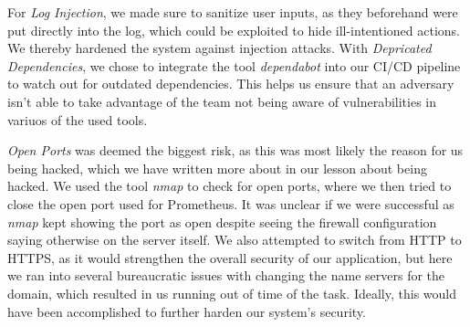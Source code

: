 For \textit{Log Injection}, we made sure to sanitize user inputs, as they beforehand were put directly into the log, which could be exploited to hide ill-intentioned actions. We thereby hardened the system against injection attacks.
With \textit{Depricated Dependencies}, we chose to integrate the tool \textit{dependabot} into our CI/CD pipeline to watch out for outdated dependencies. This helps us ensure that an adversary isn't able to take advantage of the team not being aware of vulnerabilities in variuos of the used tools.

\textit{Open Ports} was deemed the biggest risk, as this was most likely the reason for us being hacked, which we have written more about in our lesson about being hacked. We used the tool \textit{nmap} to check for open ports, where we then tried to close the open port used for Prometheus. It was unclear if we were successful as \textit{nmap} kept showing the port as open despite seeing the firewall configuration saying otherwise on the server itself.
We also attempted to switch from HTTP to HTTPS, as it would strengthen the overall security of our application, but here we ran into several bureaucratic issues with changing the name servers for the domain, which resulted in us running out of time of the task. Ideally, this would have been accomplished to further harden our system's security.
